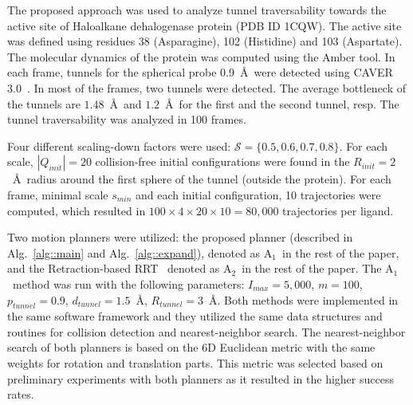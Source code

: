 \documentclass[usletter, 10pt, conference]{ieeeconf} %
\def\dt{d_{tunnel}}
\def\QI{Q_{init}}
\def\RI{R_{init}}
\def\rv{R_{tunnel}}
\def\Imax{I_{max}} %
\def\smin{s_{min}}
\def\gb{p_{tunnel}}
\def\S{\mathcal{S}}
\def\RA{A$_{1}$}
\def\RB{A$_{2}$}
\begin{document}
The proposed approach was used to analyze tunnel traversability towards the active site of Haloalkane dehalogenase protein (PDB ID 1CQW).
The active site was defined using residues 38 (Asparagine), 102 (Histidine) and 103 (Aspartate).
The molecular dynamics of the protein was computed using the Amber tool.
In each frame, tunnels for the spherical probe 0.9~\AA\ were detected using CAVER 3.0~\cite{caver3}. 
In most of the frames, two tunnels were detected.
The average bottleneck of the tunnels are $1.48$~\AA\ and $1.2$~\AA\ for the first and the second tunnel, resp.
The tunnel traversability was analyzed in 100 frames.

Four different scaling-down factors were used: $\S=\{0.5,0.6,0.7,0.8\}$.
For each scale, $|\QI|=20$ collision-free initial configurations were found in the $\RI=2$~\AA\ radius around the first sphere of the tunnel (outside the protein).
For each frame, minimal scale $\smin$ and each initial configuration, 10 trajectories were computed, which resulted
in $100 \times 4 \times 20 \times 10 = 80,000$ trajectories per ligand.

Two motion planners were utilized: the proposed planner (described in Alg.~\ref{alg::main} and Alg.~\ref{alg::expand}), 
    denoted as \RA\ in the rest of the paper, and the Retraction-based RRT~\cite{zhangRetraction} denoted as \RB\ in the rest of the paper.
The \RA\ method was run with the following parameters:
$\Imax=5,000$, $m=100$, $\gb=0.9$, $\dt=1.5$~\AA, $\rv=3$~\AA.
Both methods were implemented in the same software framework and they utilized the same data structures and routines for collision detection and nearest-neighbor search.
The nearest-neighbor search of both planners is based on the 6D Euclidean metric with the same weights for rotation and translation parts.
This metric was selected based on preliminary experiments with both planners as it resulted in the higher success rates.
\end{document}
